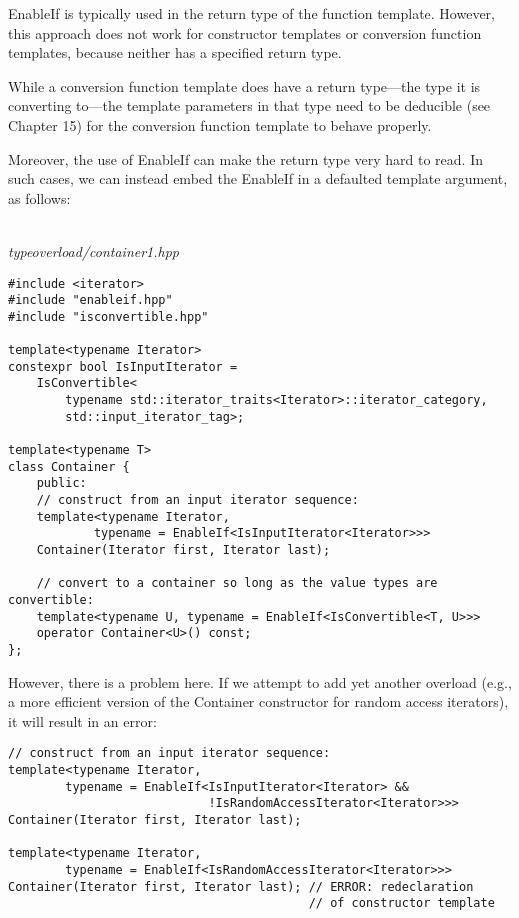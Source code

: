 
EnableIf is typically used in the return type of the function template. However, this approach does not work for constructor templates or conversion function templates, because neither has a specified return type.

\begin{tcolorbox}[colback=webgreen!5!white,colframe=webgreen!75!black]
\hspace*{0.75cm}While a conversion function template does have a return type—the type it is converting to—the template parameters in that type need to be deducible (see Chapter 15) for the conversion function template to behave properly.
\end{tcolorbox}

Moreover, the use of EnableIf can make the return type very hard to read. In such cases, we can instead embed the EnableIf in a defaulted template argument, as follows:

\hspace*{\fill} \\ %
\noindent
\textit{typeoverload/container1.hpp}
\begin{lstlisting}[style=styleCXX]
#include <iterator>
#include "enableif.hpp"
#include "isconvertible.hpp"

template<typename Iterator>
constexpr bool IsInputIterator =
	IsConvertible<
		typename std::iterator_traits<Iterator>::iterator_category,
		std::input_iterator_tag>;

template<typename T>
class Container {
	public:
	// construct from an input iterator sequence:
	template<typename Iterator,
			typename = EnableIf<IsInputIterator<Iterator>>>
	Container(Iterator first, Iterator last);
	
	// convert to a container so long as the value types are convertible:
	template<typename U, typename = EnableIf<IsConvertible<T, U>>>
	operator Container<U>() const;
};
\end{lstlisting}

However, there is a problem here. If we attempt to add yet another overload (e.g., a more efficient version of the Container constructor for random access iterators), it will result in an error:

\begin{lstlisting}[style=styleCXX]
// construct from an input iterator sequence:
template<typename Iterator,
		typename = EnableIf<IsInputIterator<Iterator> &&
							!IsRandomAccessIterator<Iterator>>>
Container(Iterator first, Iterator last);

template<typename Iterator,
		typename = EnableIf<IsRandomAccessIterator<Iterator>>>
Container(Iterator first, Iterator last); // ERROR: redeclaration
										  // of constructor template
\end{lstlisting}

